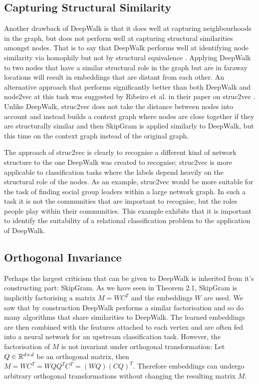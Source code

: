 \documentclass[a4paper]{article}
\begin{document}
\subsection{Capturing Structural Similarity}
Another drawback of DeepWalk is that it does well at capturing neighbourhoods in the graph, but does not perform well
at capturing structural similarities amongst nodes. That is to say that DeepWalk
performs well at identifying node similarity via homophily but not by structural equivalence \cite{grover_leskovec2016}. Applying DeepWalk to two nodes
that have a similar structural role in the graph but are in faraway locations
will result in embeddings that are distant from each other. An alternative
approach that performs significantly better than both DeepWalk and node2vec at this task was suggested by
Ribeiro et al. in their paper on struc2vec \cite{ribeiro2017}. Unlike DeepWalk, struc2vec does not
take the distance between nodes into account and instead builds a context graph
where nodes are close together if they are structurally similar and then
SkipGram is applied similarly to DeepWalk, but this time on the
context graph instead of the original graph.

The approach of struc2vec is clearly to recognise a different kind of network
structure to the one DeepWalk was created to recognise; struc2vec is more
applicable to classification tasks where the labels depend heavily on the
structural role of the nodes. As an example, struc2vec would be more suitable
for the task of finding social group leaders within a large network
graph. In such a task it is not the communities that are important to recognise,
but the roles people play within their communities. This example exhibits that it is
important to identify the suitability of a relational classification problem to
the application of DeepWalk.
\subsection{Orthogonal Invariance}
Perhaps the largest criticism that can be given to DeepWalk is inherited from it's constructing part: SkipGram. As we have
seen in Theorem 2.1, SkipGram is implicitly factorising a matrix $M = WC^T$ and the embeddings $W$ are used. We saw that
by construction DeepWalk performs a similar factorisation and so do many algorithms that share similarities to DeepWalk. The
learned embeddings are then combined with the features attached to each vertex and are often fed into a neural network for an
upstream classification task. However, the factorisation of $M$ is not invariant under orthogonal transformation: Let $Q \in \R^{d \times d}$
be an orthogonal matrix, then $M = WC^T = WQQ^TC^T = (WQ)(CQ)^T$. Therefore embeddings can undergo arbitrary orthogonal transformations
without changing the resulting matrix $M$.
\end{document}

